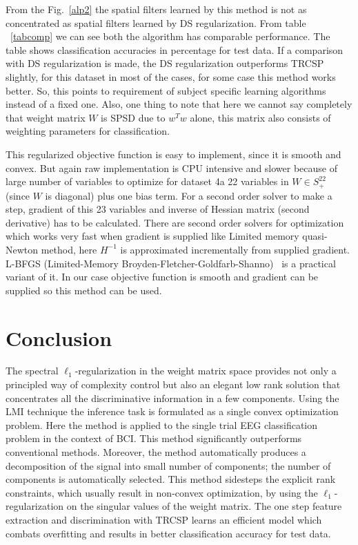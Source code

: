 From the Fig.~\ref{alp2} the spatial filters learned by this method is not as concentrated as spatial filters learned by DS regularization. From table ~\ref{tabcomp} we can see both the algorithm has comparable performance. The table shows classification accuracies in percentage for test data. If a comparison with DS regularization is made, the DS regularization outperforms TRCSP slightly, for this dataset in most of the cases, for some case this method works better. So, this points to requirement of subject specific learning algorithms instead of a fixed one. Also, one thing to note that here we cannot say completely that weight matrix $W$ is SPSD due to $w^T w$ alone, this matrix also consists of weighting parameters for classification. 

This regularized objective function is easy to implement, since it is smooth and convex. But again raw implementation is CPU intensive and slower because of large number of variables to optimize for dataset 4a 22 variables in $W\in S_+^{22}$ (since $W$ is diagonal) plus one bias term. For a second order solver to make a step, gradient of this 23 variables and inverse of Hessian matrix (second derivative) has to be calculated. There are second order solvers for optimization which works very fast when gradient is supplied like Limited memory quasi-Newton method, here $H^{-1}$ is approximated incrementally from supplied gradient. L-BFGS (Limited-Memory Broyden-Fletcher-Goldfarb-Shanno)~\cite{35} is a practical variant of it. In our case objective function is smooth and gradient can be supplied so this method can be used. 

\section{Conclusion}

The spectral $\ell_1$-regularization in the weight matrix space provides not only a principled way of complexity control but also an elegant low rank solution that concentrates all the discriminative information in a few components. Using the LMI technique the inference task is formulated  as a single convex optimization problem. Here the method is applied to the single trial EEG classification problem in the context of BCI. This method significantly outperforms conventional methods. Moreover, the method automatically produces a decomposition of the signal into small number of components; the number of components is automatically selected. This method sidesteps the explicit rank constraints, which usually result in non-convex optimization, by using the $\ell_1$-regularization on the singular values of the weight matrix. The one step feature extraction and discrimination with TRCSP learns an efficient model which combats overfitting and results in better classification accuracy for test data.

